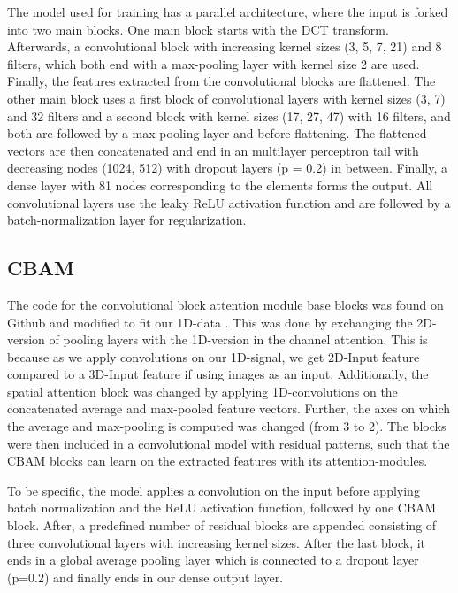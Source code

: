 The model used for training has a parallel architecture, where the input is forked into two main blocks. One main block starts with the DCT transform. Afterwards, a convolutional block with increasing kernel sizes (3, 5, 7, 21) and 8 filters, which both end with a max-pooling layer with kernel size 2 are used. Finally, the features extracted from the convolutional blocks are flattened.
The other main block uses a first block of convolutional layers with kernel sizes (3, 7) and 32 filters and a second block with kernel sizes (17, 27, 47) with 16 filters, and both are followed by a max-pooling layer and before flattening. The flattened vectors are then concatenated and end in an multilayer perceptron tail with decreasing nodes (1024, 512) with dropout layers (p = 0.2) in between. Finally, a dense layer with 81 nodes corresponding to the elements forms the output. All convolutional layers use the leaky ReLU activation function and are followed by a batch-normalization layer for regularization.


\subsection{CBAM}
The code for the convolutional block attention module base blocks was found on Github and modified to fit our 1D-data \cite{mazzia__2023}. This was done by exchanging the 2D-version of pooling layers with the 1D-version in the channel attention. This is because as we apply convolutions on our 1D-signal, we get 2D-Input feature compared to a 3D-Input feature if using images as an input. Additionally, the spatial attention block was changed by applying 1D-convolutions on the concatenated average and max-pooled feature vectors. Further, the axes on which the average and max-pooling is computed was changed (from 3 to 2).
The blocks were then included in a convolutional model with residual patterns, such that the CBAM blocks can learn on the extracted features with its attention-modules. 

To be specific, the model applies a convolution on the input before applying batch normalization and the ReLU activation function, followed by one CBAM block. After, a predefined number of residual blocks are appended consisting of three convolutional layers with increasing kernel sizes.
After the last block, it ends in a global average pooling layer which is connected to a dropout layer (p=0.2) and finally ends in our dense output layer.

